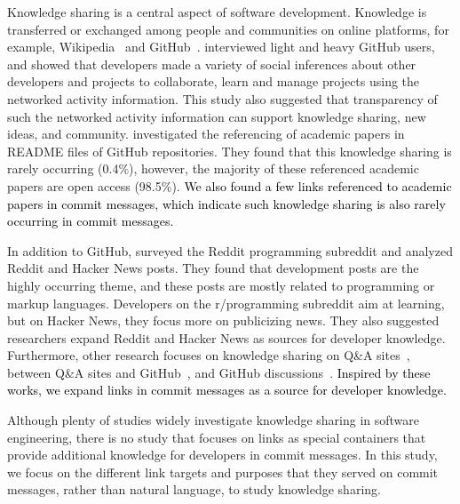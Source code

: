 \documentclass[smallextended]{svjour3}       %
\newcommand{\fix}[1]{\textcolor{black}{#1}}
\begin{document}
Knowledge sharing is a central aspect of software development.
Knowledge is transferred or exchanged among people and communities on online platforms, for example, Wikipedia~\citep{kittur2010beyond,forte2012coordination,nagar2012you} and GitHub~\citep{dabbish2012social}.
\cite{dabbish2012social} interviewed light and heavy GitHub users, and showed that developers made a variety of social inferences about other developers and
projects to collaborate, learn and manage projects using the networked activity information.
This study also suggested that transparency of such the networked activity information 
can support knowledge sharing, new ideas, and community.
\cite{wattanakriengkrai2022github} investigated the referencing of academic papers in README files of GitHub repositories. They found that this knowledge sharing is rarely occurring (0.4\%), however, the majority of these referenced academic papers are open access (98.5\%). \fix{We also found a few links referenced to academic papers in commit messages, which indicate such knowledge sharing is also rarely occurring in commit messages. }

In addition to GitHub, \cite{aniche2018modern} surveyed the Reddit programming subreddit and analyzed Reddit and Hacker News posts. They found that development posts are the highly occurring theme, and these posts are mostly related to programming or markup languages. 
Developers on the r/programming subreddit aim at learning, but on Hacker News, they focus more on publicizing news. They also suggested researchers expand Reddit and Hacker News as sources for developer knowledge. Furthermore, other research focuses on knowledge sharing on Q\&A sites~\citep{movshovitz2013analysis, vasilescu2014social, baltes2022contextual}, between Q\&A sites and GitHub~\citep{vasilescu2013stackoverflow}, and GitHub discussions~\citep{hata2022github}. \fix{Inspired by these works, we expand links in commit messages as a source for developer knowledge.}


Although plenty of studies widely investigate knowledge sharing in software engineering, there is no study that focuses on
links as special containers that provide additional knowledge for developers in commit messages. In this study, we focus on the different link targets and purposes that they served on commit messages, rather than natural language, to study knowledge sharing.
\end{document}

